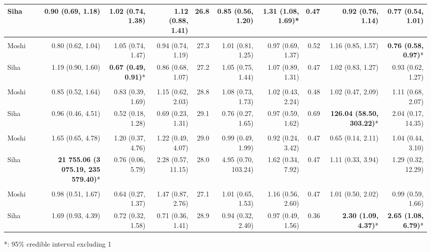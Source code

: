\begin{table}[t]
\begin{tabular*}{\linewidth}{@{\extracolsep{\fill}}l|rrrrrrrrr}
Siha & 0.90 (0.69, 1.18) & 1.02 (0.74, 1.38) & 1.12 (0.88, 1.41) & 26.8 & 0.85 (0.56, 1.20) & \textbf{1.31 (1.08, 1.69)}* & 0.47 & 0.92 (0.76, 1.14) & 0.77 (0.54, 1.01) \\ 
\midrule\addlinespace[2.5pt]
\multicolumn{10}{l}{Road Traffic Accidents} \\[2.5pt] 
\midrule\addlinespace[2.5pt]
Moshi & 0.80 (0.62, 1.04) & 1.05 (0.74, 1.47) & 0.94 (0.74, 1.19) & 27.3 & 1.01 (0.81, 1.25) & 0.97 (0.69, 1.37) & 0.52 & 1.16 (0.85, 1.57) & \textbf{0.76 (0.58, 0.97)}* \\ 
Siha & 1.19 (0.90, 1.60) & \textbf{0.67 (0.49, 0.91)}* & 0.86 (0.68, 1.07) & 27.2 & 1.05 (0.75, 1.44) & 1.07 (0.89, 1.31) & 0.47 & 1.02 (0.83, 1.27) & 0.93 (0.62, 1.27) \\ 
\midrule\addlinespace[2.5pt]
\multicolumn{10}{l}{Typhoid} \\[2.5pt] 
\midrule\addlinespace[2.5pt]
Moshi & 0.85 (0.52, 1.64) & 0.83 (0.39, 1.69) & 1.15 (0.62, 2.03) & 28.8 & 1.08 (0.73, 1.73) & 1.02 (0.43, 2.24) & 0.48 & 1.02 (0.47, 2.09) & 1.11 (0.68, 2.07) \\ 
Siha & 0.96 (0.46, 4.51) & 0.52 (0.18, 1.28) & 0.69 (0.23, 1.31) & 29.1 & 0.76 (0.27, 1.65) & 0.97 (0.59, 1.62) & 0.69 & \textbf{126.04 (58.50, 303.22)}* & 2.04 (0.17, 14.35) \\ 
\midrule\addlinespace[2.5pt]
\multicolumn{10}{l}{Leprosy} \\[2.5pt] 
\midrule\addlinespace[2.5pt]
Moshi & 1.65 (0.65, 4.78) & 1.20 (0.37, 4.76) & 1.22 (0.49, 4.07) & 29.0 & 0.99 (0.49, 1.99) & 0.92 (0.24, 3.42) & 0.47 & 0.65 (0.14, 2.11) & 1.04 (0.44, 3.10) \\ 
Siha & \textbf{21 755.06 (3 075.19, 235 579.40)}* & 0.76 (0.06, 5.79) & 2.28 (0.57, 11.15) & 28.0 & 4.95 (0.70, 103.24) & 1.62 (0.34, 7.92) & 0.47 & 1.11 (0.33, 3.94) & 1.29 (0.32, 12.29) \\ 
\midrule\addlinespace[2.5pt]
\multicolumn{10}{l}{Schistosomiasis} \\[2.5pt] 
\midrule\addlinespace[2.5pt]
Moshi & 0.98 (0.51, 1.67) & 0.64 (0.27, 1.37) & 1.47 (0.87, 2.76) & 27.1 & 1.01 (0.65, 1.53) & 1.16 (0.56, 2.60) & 0.47 & 1.01 (0.50, 2.02) & 0.99 (0.59, 1.66) \\ 
Siha & 1.69 (0.93, 4.39) & 0.72 (0.32, 1.58) & 0.71 (0.36, 1.41) & 28.9 & 0.94 (0.32, 2.40) & 0.97 (0.49, 1.56) & 0.36 & \textbf{2.30 (1.09, 4.37)}* & \textbf{2.65 (1.08, 6.79)}* \\ 
\bottomrule
\end{tabular*}
\begin{minipage}{\linewidth}
*: 95\% credible interval excluding 1\\
\end{minipage}
\end{table}

